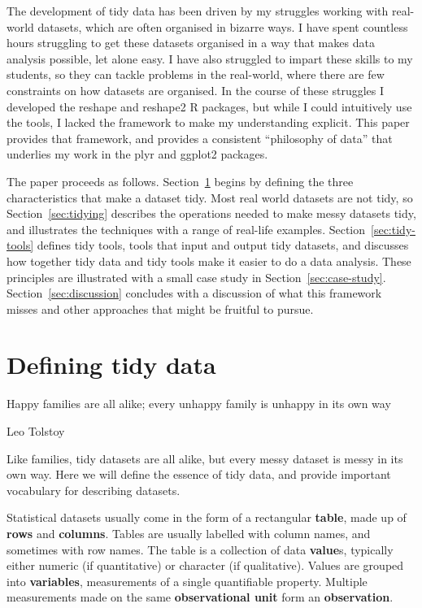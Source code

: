 \documentclass[article]{jss}
\begin{document}
The development of tidy data has been driven by my struggles working with real-world datasets, which are often organised in bizarre ways. I have spent countless hours struggling to get these datasets organised in a way that makes data analysis possible, let alone easy. I have also struggled to impart these skills to my students, so they can tackle problems in the real-world, where there are few constraints on how datasets are organised. In the course of these struggles I developed the reshape and reshape2 \citep{wickham:2007b} R packages, but while I could intuitively use the tools, I lacked the framework to make my understanding explicit. This paper provides that framework, and provides a consistent ``philosophy of data'' that underlies my work in the plyr \citep{me:plyr} and ggplot2 \citep{me:ggplot2} packages.

The paper proceeds as follows. Section~\ref{sec:defining} begins by defining the three characteristics that make a dataset tidy. Most real world datasets are not tidy, so Section~\ref{sec:tidying} describes the operations needed to make messy datasets tidy, and illustrates the techniques with a range of real-life examples. Section~\ref{sec:tidy-tools} defines tidy tools, tools that input and output tidy datasets, and discusses how together tidy data and tidy tools make it easier to do a data analysis. These principles are illustrated with a small case study in Section~\ref{sec:case-study}. Section~\ref{sec:discussion} concludes with a discussion of what this framework misses and other approaches that might be fruitful to pursue.

\section{Defining tidy data}
\label{sec:defining}

\epigraph{Happy families are all alike; every unhappy family is unhappy in its own way}{Leo Tolstoy}

Like families, tidy datasets are all alike, but every messy dataset is messy in its own way. Here we will define the essence of tidy data, and provide important vocabulary for describing datasets.

Statistical datasets usually come in the form of a rectangular \textbf{table}, made up of \textbf{rows} and \textbf{columns}. Tables are usually labelled with column names, and sometimes with row names. The table is a collection of data \textbf{value}s, typically either numeric (if quantitative) or character (if qualitative). Values are grouped into \textbf{variables}, measurements of a single quantifiable property. Multiple measurements made on the same \textbf{observational unit} form an \textbf{observation}.
\end{document}
